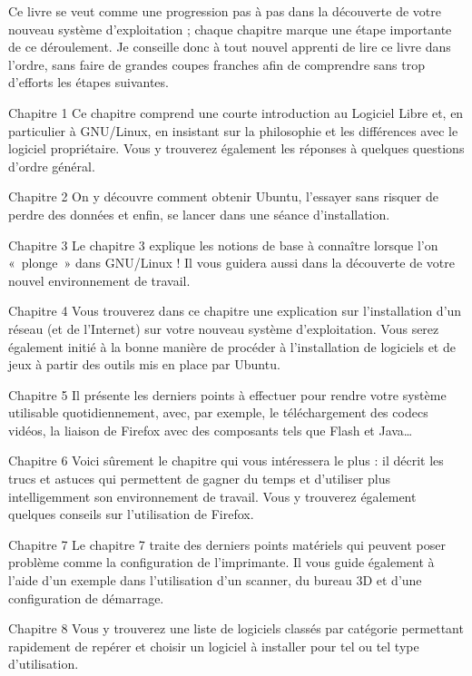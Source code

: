 Ce livre se veut comme une progression pas à pas dans la découverte de votre nouveau système d'exploitation ; chaque chapitre marque une étape importante de ce déroulement. Je conseille donc à tout nouvel apprenti de lire ce livre dans l'ordre, sans faire de grandes coupes franches afin de comprendre sans trop d'efforts les étapes suivantes.\par
\begin{DescriptionChapitres}
\item [Chapitre 1] Ce chapitre comprend une courte introduction au Logiciel Libre et, en particulier à GNU/Linux, en insistant sur la philosophie et les différences avec le logiciel propriétaire. Vous y trouverez également les réponses à quelques questions d'ordre général.
\item [Chapitre 2] On y découvre comment obtenir Ubuntu, l'essayer sans risquer de perdre des données et enfin, se lancer dans une séance d'installation.
\item [Chapitre 3] Le chapitre 3 explique les notions de base à connaître lorsque l'on «~plonge~» dans GNU/Linux ! Il vous guidera aussi dans la découverte de votre nouvel environnement de travail.
\item [Chapitre 4] Vous trouverez dans ce chapitre une explication sur l'installation d'un réseau (et de l'Internet) sur votre nouveau système d'exploitation. Vous serez également initié à la bonne manière de procéder à l'installation de logiciels et de jeux à partir des outils mis en place par Ubuntu.
\item [Chapitre 5] Il présente les derniers points à effectuer pour rendre votre système utilisable quotidiennement, avec, par exemple, le téléchargement des codecs vidéos, la liaison de Firefox avec des composants tels que Flash et Java\ldots{}
\item [Chapitre 6] Voici sûrement le chapitre qui vous intéressera le plus : il décrit les trucs et astuces qui permettent de gagner du temps et d'utiliser plus intelligemment son environnement de travail. Vous y trouverez également quelques conseils sur l'utilisation de Firefox.
\item [Chapitre 7] Le chapitre 7 traite des derniers points matériels qui peuvent poser problème comme la configuration de l'imprimante. Il vous guide également à l'aide d'un exemple dans l'utilisation d'un scanner, du bureau 3D et d'une configuration de démarrage.
\item [Chapitre 8] Vous y trouverez une liste de logiciels classés par catégorie permettant rapidement de repérer et choisir un logiciel à installer pour tel ou tel type d'utilisation.

\end{DescriptionChapitres}
